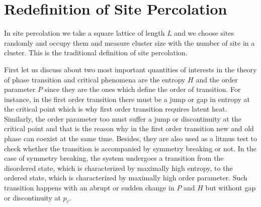\section{Redefinition of Site Percolation}
	In site percolation we take a square lattice of length $L$ and we choose sites randomly and occupy them and measure cluster size with the number of site in a cluster. This is the traditional definition of site percolation.
	
	First let us discuss about two most important quantities of interests in the		theory of phase transition and critical phenomena are the		entropy $H$ and the order parameter $P$ since they are the		ones which define the order of transition. For instance,		in the first order transition there must be a jump or gap		in entropy at the critical point which is why first order 		transition requires latent heat. Similarly, the order parameter too must suffer a jump or discontinuity at the		critical point and that is the reason why in the first order transition new and old phase can coexist at the same		time. Besides, they are also used as a litmus test to		check whether the transition is accompanied by symmetry breaking or not. In the case of symmetry breaking,		the system undergoes a transition from the disordered		state, which is characterized by maximally high entropy,		to the ordered state, which is characterized by maximally		high order parameter. Such transition happens with an		abrupt or sudden change in $P$ and $H$ but without gap	or discontinuity at $p_c$.	
